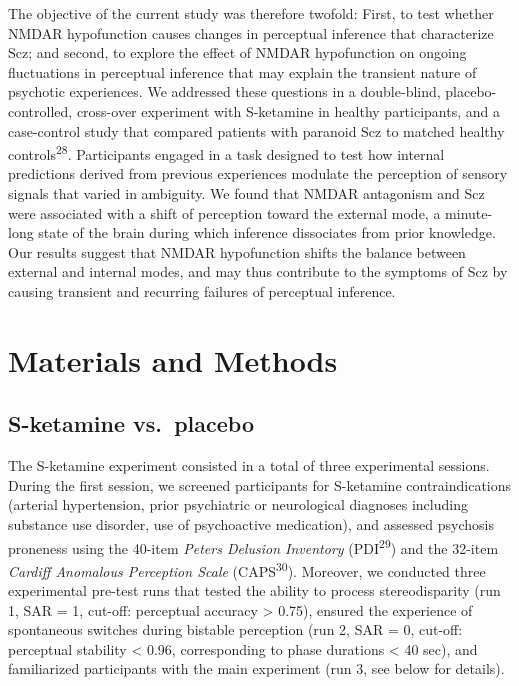 \documentclass[
]{article}
\begin{document}
The objective of the current study was therefore twofold: First, to test
whether NMDAR hypofunction causes changes in perceptual inference that
characterize Scz; and second, to explore the effect of NMDAR
hypofunction on ongoing fluctuations in perceptual inference that may
explain the transient nature of psychotic experiences. We addressed
these questions in a double-blind, placebo-controlled, cross-over
experiment with S-ketamine in healthy participants, and a case-control
study that compared patients with paranoid Scz to matched healthy
controls\textsuperscript{28}. Participants engaged in a task designed to
test how internal predictions derived from previous experiences modulate
the perception of sensory signals that varied in ambiguity. We found
that NMDAR antagonism and Scz were associated with a shift of perception
toward the external mode, a minute-long state of the brain during which
inference dissociates from prior knowledge. Our results suggest that
NMDAR hypofunction shifts the balance between external and internal
modes, and may thus contribute to the symptoms of Scz by causing
transient and recurring failures of perceptual inference.

\section{Materials and Methods}\label{materials-and-methods}

\subsection{S-ketamine vs.~placebo}\label{s-ketamine-vs.-placebo}

The S-ketamine experiment consisted in a total of three experimental
sessions. During the first session, we screened participants for
S-ketamine contraindications (arterial hypertension, prior psychiatric
or neurological diagnoses including substance use disorder, use of
psychoactive medication), and assessed psychosis proneness using the
40-item \emph{Peters Delusion Inventory} (PDI\textsuperscript{29}) and
the 32-item \emph{Cardiff Anomalous Perception Scale}
(CAPS\textsuperscript{30}). Moreover, we conducted three experimental
pre-test runs that tested the ability to process stereodisparity (run 1,
SAR = 1, cut-off: perceptual accuracy \textgreater{} 0.75), ensured the
experience of spontaneous switches during bistable perception (run 2,
SAR = 0, cut-off: perceptual stability \textless{} 0.96, corresponding
to phase durations \textless{} 40 sec), and familiarized participants
with the main experiment (run 3, see below for details).
\end{document}
